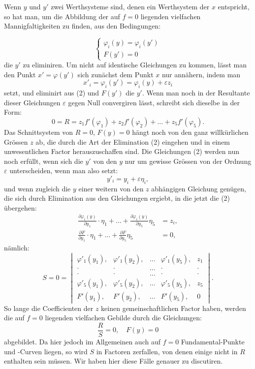 \documentclass{article}
\begin{document}
Wenn $y$ und $y'$ zwei Werthsysteme sind, denen ein Werthsystem der $x$ entspricht, so hat man, um die Abbildung der auf $f = 0$ liegenden vielfachen Mannigfaltigkeiten zu finden, aus den Bedingungen:

\[
\begin{cases}
\varphi_i(y) = \varphi_i(y') \\
F(y') = 0
\end{cases}
\tag{1}
\]
die $y'$ zu eliminiren. Um nicht auf identische Gleichungen zu kommen, lässt man den Punkt $x' = \varphi(y')$ sich zunächst dem Punkt $x$ nur annähern, indem man
\[
x'_i = \varphi_i(y') = \varphi_i(y) + \varepsilon z_i \tag{2}
\]
setzt, und eliminirt aus (2) und $F(y')$ die $y'$. Wenn man noch in der Resultante dieser Gleichungen $\varepsilon$ gegen Null convergiren lässt, schreibt sich dieselbe in der Form:
\[
0 = R = z_1 f'(\varphi_1) + z_2 f'(\varphi_2) + \dots + z_5 f'(\varphi_5) . \tag{3}
\]
Das Schnittsystem von $R = 0$, $F(y) = 0$ hängt noch von den ganz willkürlichen Grössen $z$ ab, die durch die Art der Elimination (2) eingehen und in einem unwesentlichen Factor herauszuschaffen sind. Die Gleichungen (2) werden nun noch erfüllt, wenn sich die $y'$ von den $y$ nur um gewisse Grössen von der Ordnung $\varepsilon$ unterscheiden, wenn man also setzt:
\[
y'_i = y_i + \varepsilon \eta_i ,
\]
und wenn zugleich die $y$ einer weitern von den $z$ abhängigen Gleichung genügen, die sich durch Elimination aus den Gleichungen ergiebt, in die jetzt die (2) übergehen:
\[
\begin{aligned}
\frac{\partial \varphi_i(y)}{\partial y_1} \cdot \eta_1 + \dots + \frac{\partial \varphi_i(y)}{\partial y_5} \eta_5 &= z_i , \\
\frac{\partial F}{\partial y_1} \cdot \eta_1 + \dots + \frac{\partial F}{\partial y_5} \eta_5 &= 0 ,
\end{aligned}
\]
nämlich:
\[
S = 0 =
\begin{vmatrix}
\varphi'_1(y_1), & \varphi'_1(y_2), & \dots & \varphi'_1(y_5), & z_1 \\
\cdot & \cdot & \dots & \cdot & \cdot \\
\cdot & \cdot & \dots & \cdot & \cdot \\
\varphi'_5(y_1), & \varphi'_5(y_2), & \dots & \varphi'_5(y_5), & z_5 \\
F'(y_1), & F'(y_2), & \dots & F'(y_5), & 0
\end{vmatrix} . \tag{4}
\]
So lange die Coefficienten der $z$ keinen gemeinschaftlichen Factor haben, werden die auf $f = 0$ liegenden vielfachen Gebilde durch die Gleichungen:
\[
\frac{R}{S} = 0, \quad F(y) = 0
\]
abgebildet. Da hier jedoch im Allgemeinen auch auf $f = 0$ Fundamental-Punkte und -Curven liegen, so wird $S$ in Factoren zerfallen, von denen einige nicht in $R$ enthalten sein müssen. Wir haben hier diese Fälle genauer zu discutiren.
\end{document}
